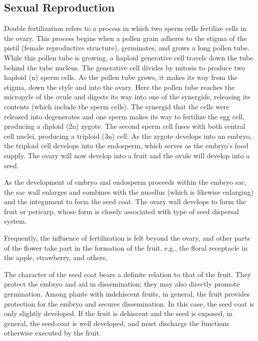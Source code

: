 \subsection{Sexual Reproduction}\label{sexual-reproduction}

Double fertilization refers to a process in which two sperm cells
fertilize cells in the ovary. This process begins when a pollen grain
adheres to the stigma of the pistil (female reproductive structure),
germinates, and grows a long pollen tube. While this pollen tube is
growing, a haploid generative cell travels down the tube behind the tube
nucleus. The generative cell divides by mitosis to produce two haploid
(n) sperm cells. As the pollen tube grows, it makes its way from the
stigma, down the style and into the ovary. Here the pollen tube reaches
the micropyle of the ovule and digests its way into one of the
synergids, releasing its contents (which include the sperm cells). The
synergid that the cells were released into degenerates and one sperm
makes its way to fertilize the egg cell, producing a diploid (2n)
zygote. The second sperm cell fuses with both central cell nuclei,
producing a triploid (3n) cell. As the zygote develops into an embryo,
the triploid cell develops into the endosperm, which serves as the
embryo's food supply. The ovary will now develop into a fruit and the
ovule will develop into a seed.

As the development of embryo and endosperm proceeds within the embryo
sac, the sac wall enlarges and combines with the nucellus (which is
likewise enlarging) and the integument to form the seed coat. The ovary
wall develops to form the fruit or pericarp, whose form is closely
associated with type of seed dispersal system.

Frequently, the influence of fertilization is felt beyond the ovary, and
other parts of the flower take part in the formation of the fruit, e.g.,
the floral receptacle in the apple, strawberry, and others.

The character of the seed coat bears a definite relation to that of the
fruit. They protect the embryo and aid in dissemination; they may also
directly promote germination. Among plants with indehiscent fruits, in
general, the fruit provides protection for the embryo and secures
dissemination. In this case, the seed coat is only slightly developed.
If the fruit is dehiscent and the seed is exposed, in general, the
seed-coat is well developed, and must discharge the functions otherwise
executed by the fruit.


